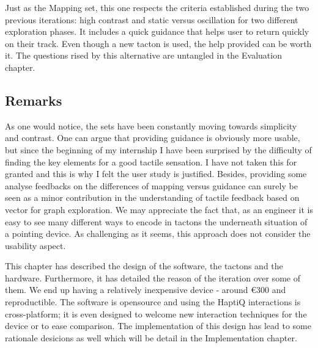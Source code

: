 Just as the Mapping set, this one respects the criteria established
during the two previous iterations: high contrast and static versus
oscillation for two different exploration phases. It includes a quick
guidance that helps user to return quickly on their track. Even though a
new tacton is used, the help provided can be worth it. The questions
rised by this alternative are untangled in the Evaluation chapter.

\subsection{Remarks}\label{remarks}

As one would notice, the sets have
been constantly moving towards simplicity and contrast. One can argue
that providing guidance is obviously more usable, but since the
beginning of my internship I have been surprised by the difficulty of
finding the key elements for a good tactile sensation. I have not taken
this for granted and this is why I felt the user study is justified.
Besides, providing some analyse feedbacks on the differences of mapping
versus guidance can surely be seen as a minor contribution in the
understanding of tactile feedback based on vector for graph exploration.
We may appreciate the fact that, as an engineer it is easy to see many
different ways to encode in tactons the underneath situation of a
pointing device. As challenging as it seems, this approach does not
consider the usability aspect.

This chapter has described the design of the software, the tactons and
the hardware. Furthermore, it has detailed the reason of the iteration
over some of them. We end up having a relatively inexpensive device -
around \euro{300} and reproductible. The software is opensource and
using the HaptiQ interactions is cross-platform; it is even designed to
welcome new interaction techniques for the device or to ease comparison.
The implementation of this design has lead to some rationale desicions
as well which will be detail in the Implementation chapter.
